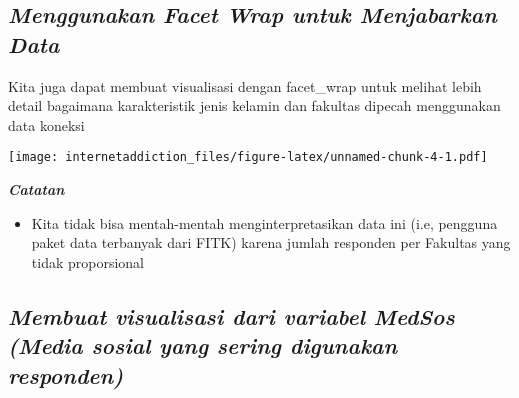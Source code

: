 \documentclass[
]{article}
\newenvironment{Shaded}{\begin{snugshade}}{\end{snugshade}}
\newcommand{\CommentTok}[1]{\textcolor[rgb]{0.56,0.35,0.01}{\textit{#1}}}
\newcommand{\DataTypeTok}[1]{\textcolor[rgb]{0.13,0.29,0.53}{#1}}
\newcommand{\DecValTok}[1]{\textcolor[rgb]{0.00,0.00,0.81}{#1}}
\newcommand{\KeywordTok}[1]{\textcolor[rgb]{0.13,0.29,0.53}{\textbf{#1}}}
\newcommand{\NormalTok}[1]{#1}
\newcommand{\OperatorTok}[1]{\textcolor[rgb]{0.81,0.36,0.00}{\textbf{#1}}}
\newcommand{\StringTok}[1]{\textcolor[rgb]{0.31,0.60,0.02}{#1}}
\providecommand{\tightlist}{%
  \setlength{\itemsep}{0pt}\setlength{\parskip}{0pt}}
\begin{document}
\hypertarget{menggunakan-facet-wrap-untuk-menjabarkan-data}{%
\subsection{\texorpdfstring{\emph{Menggunakan Facet Wrap untuk
Menjabarkan
Data}}{Menggunakan Facet Wrap untuk Menjabarkan Data}}\label{menggunakan-facet-wrap-untuk-menjabarkan-data}}

Kita juga dapat membuat visualisasi dengan facet\_wrap untuk melihat
lebih detail bagaimana karakteristik jenis kelamin dan fakultas dipecah
menggunakan data koneksi

\begin{Shaded}
\end{Shaded}

\texttt{[image: internetaddiction\_files/figure-latex/unnamed-chunk-4-1.pdf]}

\textbf{\emph{Catatan}}

\begin{itemize}
\tightlist
\item
  Kita tidak bisa mentah-mentah menginterpretasikan data ini (i.e,
  pengguna paket data terbanyak dari FITK) karena jumlah responden per
  Fakultas yang tidak proporsional
\end{itemize}

\hypertarget{membuat-visualisasi-dari-variabel-medsos-media-sosial-yang-sering-digunakan-responden}{%
\subsection{\texorpdfstring{\emph{Membuat visualisasi dari variabel
MedSos (Media sosial yang sering digunakan
responden)}}{Membuat visualisasi dari variabel MedSos (Media sosial yang sering digunakan responden)}}\label{membuat-visualisasi-dari-variabel-medsos-media-sosial-yang-sering-digunakan-responden}}
\end{document}
